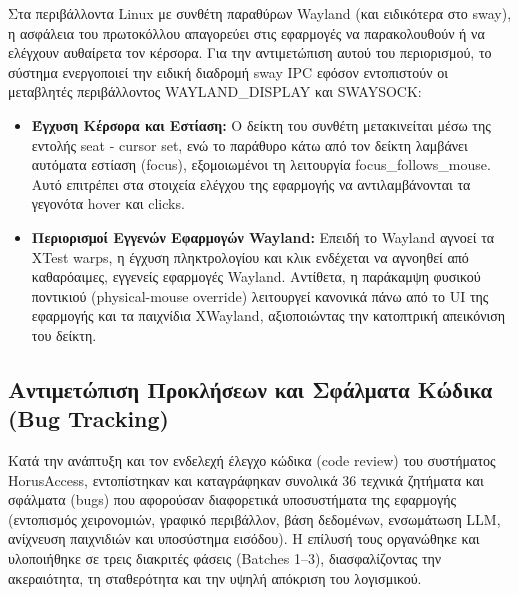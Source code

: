 \documentclass[twoside, a4paper, 11pt]{article}
\newcommand{\textlatin}[1]{\textenglish{#1}}
\begin{document}
Στα περιβάλλοντα \textlatin{Linux} με συνθέτη παραθύρων \textlatin{Wayland} (και ειδικότερα στο \textlatin{sway}), η ασφάλεια του πρωτοκόλλου απαγορεύει στις εφαρμογές να παρακολουθούν ή να ελέγχουν αυθαίρετα τον κέρσορα. Για την αντιμετώπιση αυτού του περιορισμού, το σύστημα ενεργοποιεί την ειδική διαδρομή \textlatin{sway IPC} εφόσον εντοπιστούν οι μεταβλητές περιβάλλοντος \textlatin{WAYLAND\_DISPLAY} και \textlatin{SWAYSOCK}:
\begin{itemize}
    \item \textbf{Έγχυση Κέρσορα και Εστίαση:} Ο δείκτη του συνθέτη μετακινείται μέσω της εντολής \textlatin{seat - cursor set}, ενώ το παράθυρο κάτω από τον δείκτη λαμβάνει αυτόματα εστίαση (\textlatin{focus}), εξομοιωμένοι τη λειτουργία \textlatin{focus\_follows\_mouse}. Αυτό επιτρέπει στα στοιχεία ελέγχου της εφαρμογής να αντιλαμβάνονται τα γεγονότα \textlatin{hover} και \textlatin{clicks}.
    \item \textbf{Περιορισμοί Εγγενών Εφαρμογών Wayland:} Επειδή το \textlatin{Wayland} αγνοεί τα \textlatin{XTest warps}, η έγχυση πληκτρολογίου και κλικ ενδέχεται να αγνοηθεί από καθαρόαιμες, εγγενείς εφαρμογές \textlatin{Wayland}. Αντίθετα, η παράκαμψη φυσικού ποντικιού (\textlatin{physical-mouse override}) λειτουργεί κανονικά πάνω από το \textlatin{UI} της εφαρμογής και τα παιχνίδια \textlatin{XWayland}, αξιοποιώντας την κατοπτρική απεικόνιση του δείκτη.
\end{itemize}

\subsection{Αντιμετώπιση Προκλήσεων και Σφάλματα Κώδικα (Bug Tracking)}

Κατά την ανάπτυξη και τον ενδελεχή έλεγχο κώδικα (\textlatin{code review}) του συστήματος \textlatin{HorusAccess}, εντοπίστηκαν και καταγράφηκαν συνολικά 36 τεχνικά ζητήματα και σφάλματα (\textlatin{bugs}) που αφορούσαν διαφορετικά υποσυστήματα της εφαρμογής (εντοπισμός χειρονομιών, γραφικό περιβάλλον, βάση δεδομένων, ενσωμάτωση LLM, ανίχνευση παιχνιδιών και υποσύστημα εισόδου). Η επίλυσή τους οργανώθηκε και υλοποιήθηκε σε τρεις διακριτές φάσεις (\textlatin{Batches 1--3}), διασφαλίζοντας την ακεραιότητα, τη σταθερότητα και την υψηλή απόκριση του λογισμικού.
\end{document}
